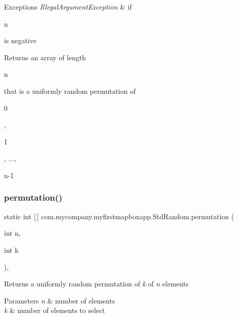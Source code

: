 \begin{DoxyExceptions}{Exceptions}
{\em Illegal\+Argument\+Exception} & if
\begin{DoxyCode}
n 
\end{DoxyCode}
 is negative \\
\hline
\end{DoxyExceptions}
\begin{DoxyReturn}{Returns}
an array of length
\begin{DoxyCode}
n 
\end{DoxyCode}
 that is a uniformly random permutation of
\begin{DoxyCode}
0 
\end{DoxyCode}
 ,
\begin{DoxyCode}
1 
\end{DoxyCode}
 , ...,
\begin{DoxyCode}
n-1 
\end{DoxyCode}
 
\end{DoxyReturn}
\mbox{\label{classcom_1_1mycompany_1_1myfirstmapboxapp_1_1_std_random_ab7142e0b7a6d10ad398fd45906eae081}} 
\subsubsection{\texorpdfstring{permutation()}{permutation()}\hspace{0.1cm}{\footnotesize\ttfamily [2/2]}}
{\footnotesize\ttfamily static int \mbox{[}$\,$\mbox{]} com.\+mycompany.\+myfirstmapboxapp.\+Std\+Random.\+permutation (\begin{DoxyParamCaption}\item[{int}]{n,  }\item[{int}]{k }\end{DoxyParamCaption})\hspace{0.3cm}{\ttfamily [inline]}, {\ttfamily [static]}}

Returns a uniformly random permutation of {\itshape k} of {\itshape n} elements


\begin{DoxyParams}{Parameters}
{\em n} & number of elements \\
\hline
{\em k} & number of elements to select \\
\hline
\end{DoxyParams}

